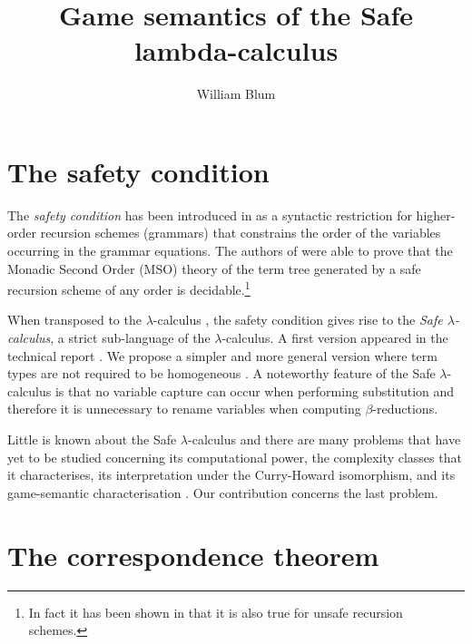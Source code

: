 \documentclass{ouclprgsc}
\begin{document}
\title{Game semantics of the Safe lambda-calculus}

\author{William Blum}

\maketitle

\vspace{0.5cm}

\section{The safety condition}

\noindent The \emph{safety condition} has been introduced in
\cite{KNU02} as a syntactic restriction for higher-order recursion
schemes (grammars) that constrains the order of the variables
occurring in the grammar equations. The authors of \cite{KNU02} were
able to prove that the Monadic Second Order (MSO) theory of the term
tree generated by a safe recursion scheme of any order is
decidable.\footnote{In fact it has been shown in \cite{OngLics2006}
that it is also true for unsafe recursion schemes.}

When transposed to the $\lambda$-calculus \cite{Barendregt84}, the
safety condition gives rise to the \emph{Safe $\lambda$-calculus}, a
strict sub-language of the $\lambda$-calculus. A first version
appeared in the technical report \cite{safety-mirlong2004}. We
propose a simpler and more general version where term types are not
required to be homogeneous \cite{blumtransfer}. A noteworthy feature
of the Safe $\lambda$-calculus is that no variable capture can occur
when performing substitution and therefore it is unnecessary to
rename variables when computing $\beta$-reductions.

Little is known about the Safe $\lambda$-calculus and there are many
 problems that have yet to be studied concerning its
computational power, the complexity classes that it characterises,
its interpretation under the Curry-Howard isomorphism, and its
game-semantic characterisation
\cite{abramsky:game-semantics-tutorial}. Our contribution concerns
the last problem.

\section{The correspondence theorem}
\end{document}
